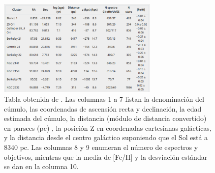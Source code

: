 \begin{figure}
	\centering
	\includegraphics[width=0.7\textwidth]{img/tesis/open_cluster_sample.pdf}
	\caption{Tabla obtenida de \cite{Bragaglia2022}. Las columnas 1 a 7 listan la denominación del cúmulo, las coordenadas de ascensión recta y declinación, la edad estimada del cúmulo, la distancia (módulo de distancia convertido) en parsecs (pc) , la posición Z en coordenadas cartesianas galácticas, y la distancia desde el centro galáctico suponiendo que el Sol está a 8340 pc. Las columnas 8 y 9 enumeran el número de espectros y objetivos, mientras que la media de [Fe/H] y la desviación estándar se dan en la columna 10.}
	\label{fig:open_cluster_sample}
\end{figure}


\endinput
